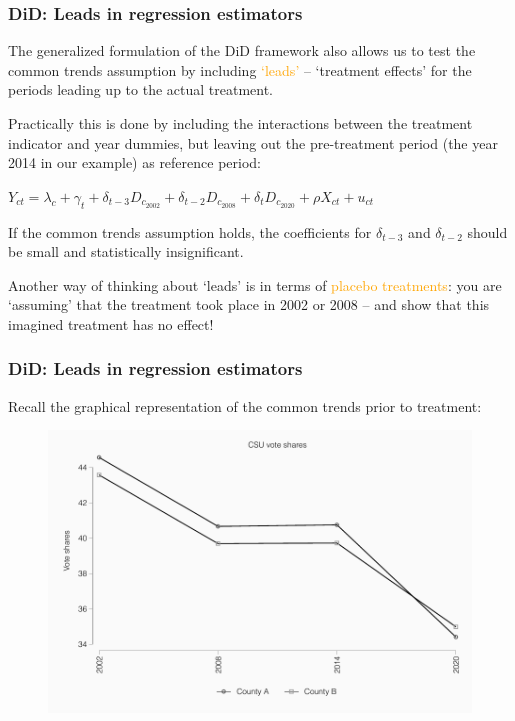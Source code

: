 \documentclass[12pt,english,dvipsnames,aspectratio=169,handout]{beamer}\usepackage[]{graphicx}\usepackage[]{xcolor}
\begin{document}
\begin{frame}
  \frametitle{DiD: Leads in regression estimators}
\footnotesize

The generalized formulation of the DiD framework also allows us to test the common trends assumption by including \textcolor{orange}{`leads'} -- `treatment effects' for the periods leading up to the actual treatment.

Practically this is done by including the interactions between the treatment indicator and year dummies, but leaving out the pre-treatment period (the year 2014 in our example) as reference period:

$Y_{ct} = \lambda_c + \gamma_t + \delta_{t-3} D_{c_{2002}} + \delta_{t-2} D_{c_{2008}} + \delta_t D_{c_{2020}} + \rho X_{ct} + u_{ct}$

If the common trends assumption holds, the coefficients for $\delta_{t-3}$ and $\delta_{t-2}$ should be small and statistically insignificant.

Another way of thinking about `leads' is in terms of \textcolor{orange}{placebo treatments}: you are `assuming' that the treatment took place in 2002 or 2008 -- and show that this imagined treatment has no effect!

\end{frame}


\begin{frame}
  \frametitle{DiD: Leads in regression estimators}
\footnotesize

Recall the graphical representation of the common trends prior to treatment:
	 \begin{figure} 
    \includegraphics[height=.6\textheight,keepaspectratio=true]{../04-figures/08/02-fourperiod.pdf}
    \end{figure}
\end{frame}
\end{document}
